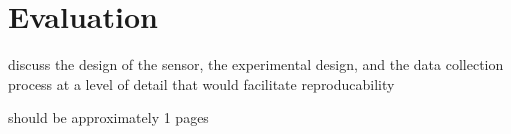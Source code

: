 \section{Evaluation}
\label{evaluation}

discuss the design of the sensor, the experimental design, and the data collection process at a level of detail that would facilitate reproducability

should be approximately 1 pages